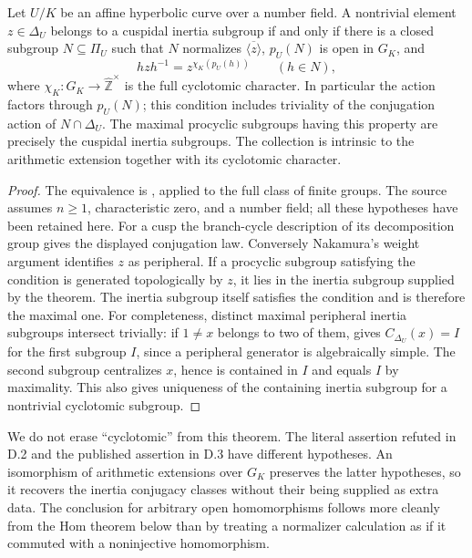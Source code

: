 Let $U/K$ be an affine hyperbolic curve over a number field.  A nontrivial
element $z\in\Delta_U$ belongs to a cuspidal inertia subgroup if and only if
there is a closed subgroup $N\subseteq\Pi_U$ such that $N$ normalizes
$\overline{\langle z\rangle}$, $p_U(N)$ is open in $G_K$, and
\[
 hzh^{-1}=z^{\chi_K(p_U(h))}\qquad(h\in N),
\]
where $\chi_K:G_K\to\widehat{\mathbb Z}^{\times}$ is the full cyclotomic
character.  In particular the action factors through $p_U(N)$; this condition
includes triviality of the conjugation action of $N\cap\Delta_U$.
The maximal procyclic subgroups having this property are precisely the
cuspidal inertia subgroups.  The collection is intrinsic to the arithmetic
extension together with its cyclotomic character.
\begin{proof}
The equivalence is \citet[Theorem (2.1.1)]{Nakamura1994}, applied to the full
class of finite groups.  The source assumes $n\geq1$, characteristic zero,
and a number field; all these hypotheses have been retained here.
For a cusp the branch-cycle description of its decomposition group gives
the displayed conjugation law.  Conversely Nakamura's weight argument identifies
$z$ as peripheral.  If a procyclic subgroup satisfying the condition is generated
topologically by $z$, it lies in the inertia subgroup supplied by the theorem.
The inertia subgroup itself satisfies the condition and is therefore the maximal
one.  For completeness, distinct maximal peripheral inertia subgroups intersect
trivially: if $1\ne x$ belongs to two of them, \citet[Proposition 3.6]{BoggiZalesskii2019BC}
gives $C_{\Delta_U}(x)=I$ for the first subgroup $I$, since a peripheral
generator is algebraically simple.  The second subgroup centralizes $x$, hence
is contained in $I$ and equals $I$ by maximality.  This also gives uniqueness
of the containing inertia subgroup for a nontrivial cyclotomic subgroup.
\end{proof}
We do not erase ``cyclotomic'' from this theorem.  The literal assertion refuted
in D.2 and the published assertion in D.3 have different hypotheses.  An
isomorphism of arithmetic extensions over $G_K$ preserves the latter hypotheses,
so it recovers the inertia conjugacy classes without their being supplied as
extra data.  The conclusion for arbitrary open homomorphisms follows more
cleanly from the Hom theorem below than by treating a normalizer calculation
as if it commuted with a noninjective homomorphism.

